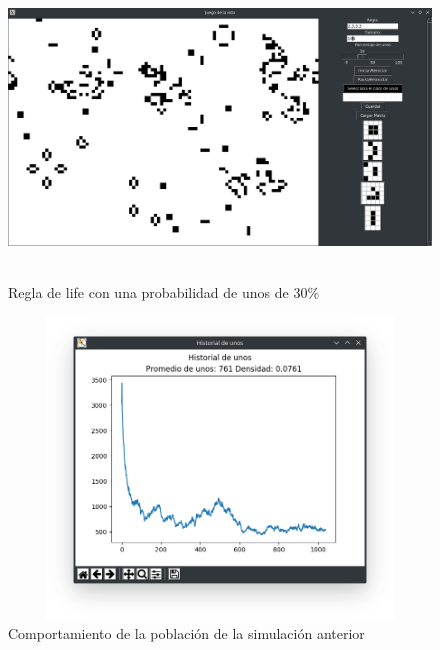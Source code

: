 \begin{figure}[H]
\begin{center}
 \includegraphics[width=12cm, height=8cm]{./img/life30.png}
 \caption{Regla de life con una probabilidad de unos de 30\%}
 \label{fig:life30}
\end{center}
\end{figure}

\begin{figure}[H]
\begin{center}
 \includegraphics[width=12cm, height=8cm]{./img/life30grafica.png}
 \caption{Comportamiento de la población de la simulación anterior}
 \label{fig:life30grafica}
\end{center}
\end{figure}

